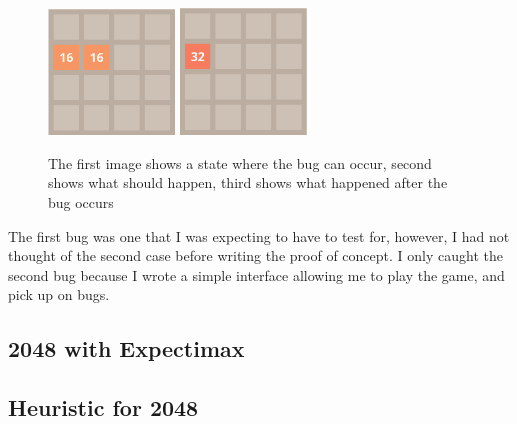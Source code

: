\documentclass{article}
\begin{document}
\begin{itemize}
\begin{figure}
        \includegraphics[width=0.3\textwidth]{2048_merge2.png}
        \includegraphics[width=0.3\textwidth]{2048_merge3.png}
        \caption{The first image shows a state where the bug can occur, second shows what should happen, third shows what happened after the bug occurs}
        \label{fig:mergebug}
    \end{figure}
\end{itemize}
The first bug was one that I was expecting to have to test for, however, I had not thought of the second case before writing the proof of concept. I only caught the second bug because I wrote a simple interface allowing me to play the game, and pick up on bugs.
\subsection{2048 with Expectimax}
\label{subsec:2048_expectimax}


\subsection{Heuristic for 2048}
\label{subsec:heuristic}
\end{document}

